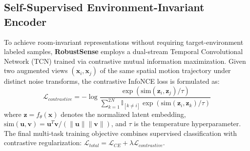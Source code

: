 \subsection{Self-Supervised Environment-Invariant Encoder}
To achieve room-invariant representations without requiring target-environment labeled samples, \textbf{RobustSense} employs a dual-stream Temporal Convolutional Network (TCN) trained via contrastive mutual information maximization. Given two augmented views $(\mathbf{x}_i, \mathbf{x}_j)$ of the same spatial motion trajectory under distinct noise transforms, the contrastive InfoNCE loss is formulated as:
\begin{equation}
    \mathcal{L}_{contrastive} = - \log \frac{\exp(\text{sim}(\mathbf{z}_i, \mathbf{z}_j) / \tau)}{\sum_{k=1}^{2N} \mathbb{I}_{[k \neq i]} \exp(\text{sim}(\mathbf{z}_i, \mathbf{z}_k) / \tau)}
    \label{eq:contrastive}
\end{equation}
where $\mathbf{z} = f_{\theta}(\mathbf{x})$ denotes the normalized latent embedding, $\text{sim}(\mathbf{u}, \mathbf{v}) = \mathbf{u}^T \mathbf{v} / (\|\mathbf{u}\| \|\mathbf{v}\|)$, and $\tau$ is the temperature hyperparameter. The final multi-task training objective combines supervised classification with contrastive regularization: $\mathcal{L}_{total} = \mathcal{L}_{CE} + \lambda \mathcal{L}_{contrastive}$.
